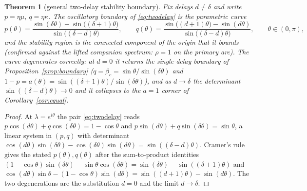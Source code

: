 \documentclass[11pt]{article}
\newtheorem{theorem}{Theorem}
\theoremstyle{definition}
\begin{document}
\begin{theorem}[general two-delay stability boundary]\label{thm:twodelay}
Fix delays $d\neq\delta$ and write $p=\eta\mu,\ q=\eta\kappa$. The oscillatory boundary of
\eqref{eq:twodelay} is the parametric curve
\[
  p(\theta)=\frac{\sin(\delta\theta)-\sin\big((\delta+1)\theta\big)}{\sin\big((\delta-d)\theta\big)},
  \qquad
  q(\theta)=\frac{\sin\big((d+1)\theta\big)-\sin(d\theta)}{\sin\big((\delta-d)\theta\big)},
  \qquad \theta\in(0,\pi),
\]
and the stability region is the connected component of the origin that it bounds (confirmed
against the lifted companion spectrum: $\rho=1$ on the primary arc). The curve degenerates
correctly: at $d=0$ it returns the single-delay boundary of Proposition~\ref{prop:boundary}
($q=\beta_c=\sin\theta/\sin(\delta\theta)$ and $1-p=a(\theta)=\sin((\delta+1)\theta)/\sin(\delta\theta)$),
and as $d\to\delta$ the determinant $\sin((\delta-d)\theta)\to0$ and it collapses to the $a=1$
corner of Corollary~\ref{cor:equal}.
\end{theorem}
\begin{proof}
At $\lambda=e^{i\theta}$ the pair \eqref{eq:twodelay} reads
$p\cos(d\theta)+q\cos(\delta\theta)=1-\cos\theta$ and
$p\sin(d\theta)+q\sin(\delta\theta)=\sin\theta$, a linear system in $(p,q)$ with determinant
$\cos(d\theta)\sin(\delta\theta)-\cos(\delta\theta)\sin(d\theta)=\sin((\delta-d)\theta)$. Cramer's
rule gives the stated $p(\theta),q(\theta)$ after the sum-to-product identities
$(1-\cos\theta)\sin(\delta\theta)-\sin\theta\cos(\delta\theta)=\sin(\delta\theta)-\sin((\delta+1)\theta)$
and $\cos(d\theta)\sin\theta-(1-\cos\theta)\sin(d\theta)=\sin((d+1)\theta)-\sin(d\theta)$. The two
degenerations are the substitution $d=0$ and the limit $d\to\delta$.
\end{proof}
\end{document}
